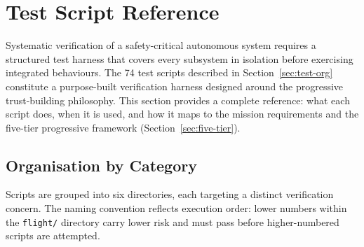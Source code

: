 
\section{Test Script Reference}\label{sec:test-scripts}

Systematic verification of a safety-critical autonomous system requires a structured test harness that covers every subsystem in isolation before exercising integrated behaviours.  The 74 test scripts described in Section~\ref{sec:test-org} constitute a purpose-built verification harness designed around the progressive trust-building philosophy.  This section provides a complete reference: what each script does, when it is used, and how it maps to the mission requirements and the five-tier progressive framework (Section~\ref{sec:five-tier}).

\subsection{Organisation by Category}\label{sec:script-categories}

Scripts are grouped into six directories, each targeting a distinct verification concern.  The naming convention reflects execution order: lower numbers within the \texttt{flight/} directory carry lower risk and must pass before higher-numbered scripts are attempted.

